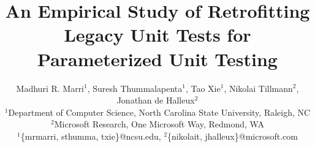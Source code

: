 \documentclass{sig-alternate}
\begin{document}
\title{An Empirical Study of Retrofitting Legacy Unit Tests for Parameterized Unit Testing}

\author{Madhuri R. Marri$^1$, Suresh Thummalapenta$^1$, Tao Xie$^1$, Nikolai Tillmann$^2$, Jonathan de Halleux$^2$\\
\small{$^1$Department of Computer Science, North Carolina State University, Raleigh, NC}\\
\small{$^2$Microsoft Research, One Microsoft Way, Redmond, WA}\\
\small{$^1$\{mrmarri, sthumma, txie\}@ncsu.edu, $^2$\{nikolait, jhalleux\}@microsoft.com}\\}
\maketitle
\end{document}
